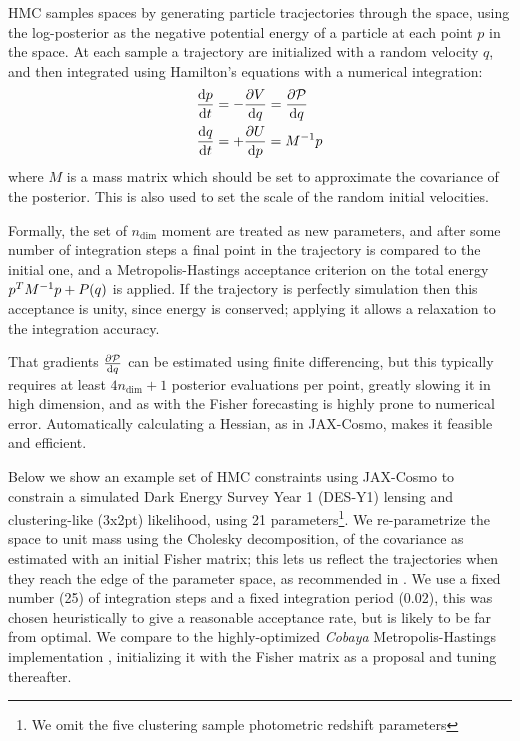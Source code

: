\documentclass[final,5p,times,twocolumn,authoryear]{elsarticle}
\begin{document}
HMC samples spaces by generating particle tracjectories through the space, using the log-posterior
as the negative potential energy of a particle at each point $p$ in the space.  At each sample a trajectory are initialized
with a random velocity $q$, and then integrated using Hamilton's equations with a numerical integration:
\begin{align}
\frac{\mathrm{d}p}{\mathrm{d}t} &= - \frac{\partial V}{\mathrm{d} q} = \frac{\partial {\cal P}}{\mathrm{d} q}\\
\frac{\mathrm{d}q}{\mathrm{d}t} &= + \frac{\partial U}{\mathrm{d} p} = M^{-1} p
\end{align}
where $M$ is a mass matrix which should be set to approximate the covariance of the posterior. This is also
used to set the scale of the random initial velocities.

Formally, the set of $n_\mathrm{dim}$ moment are treated as new parameters, and after 
some number of integration steps a final point in the trajectory is compared to the initial one,
and a Metropolis-Hastings acceptance criterion on the total energy $p^T M^{-1} p + {\cal}P(q)$ is applied.
If the trajectory is perfectly simulation then this acceptance is unity, since energy is conserved; applying it allows
a relaxation to the integration accuracy.

That gradients $\frac{\partial {\cal P}}{\mathrm{d} q}$ can be estimated using finite differencing,
but this typically requires at least $4 n_{\mathrm{dim}} + 1$ posterior evaluations per point, greatly slowing it
in high dimension, and as with the Fisher forecasting is highly prone to numerical error. Automatically
calculating a Hessian, as in JAX-Cosmo, makes it feasible and efficient.

Below we show an example set of HMC constraints using JAX-Cosmo to constrain a simulated
Dark Energy Survey Year 1 (DES-Y1) lensing and clustering-like (3x2pt) likelihood, using 21 parameters\footnote{We omit the 
five clustering sample photometric redshift parameters}.  We re-parametrize the space to unit mass using the Cholesky 
decomposition,
of the covariance as estimated with an initial Fisher matrix; this lets us reflect the trajectories when they reach the
edge of the parameter space, as recommended in \citet{afshar}.  We use a fixed number (25) of integration steps and 
a fixed integration period (0.02), this was chosen heuristically to give a reasonable acceptance rate, but is likely to be
far from optimal.  We compare to the highly-optimized \emph{Cobaya} 
Metropolis-Hastings implementation \citep{cobaya1,cobaya2}, initializing it with the Fisher matrix as a proposal and
tuning thereafter.
\end{document}
